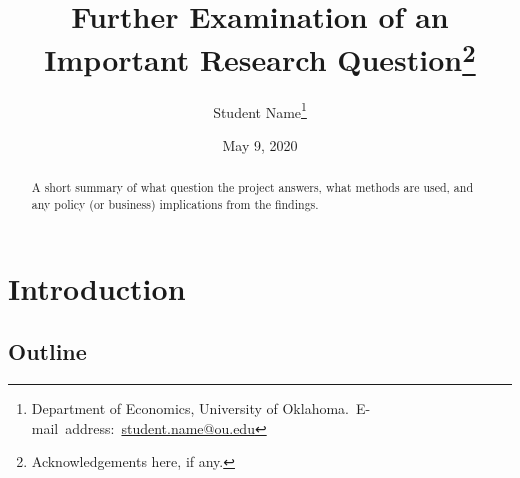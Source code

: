 \documentclass[12pt,english]{article}
\begin{document}
\begin{singlespace}
\title{Further Examination of an Important Research Question\thanks{Acknowledgements here, if any.}}
\end{singlespace}

\author{Student Name\thanks{Department of Economics, University of Oklahoma.\
E-mail~address:~\href{mailto:student.name@ou.edu}{student.name@ou.edu}}}

\date{May 9, 2020}

\maketitle

\begin{abstract}
\begin{singlespace}
A short summary of what question the project answers, what methods are used, and any policy (or business) implications from the findings.
\end{singlespace}

\end{abstract}
\vfill{}


\pagebreak{}


\section{Introduction}\label{sec:intro}
\subsection{Outline}
\end{document}
